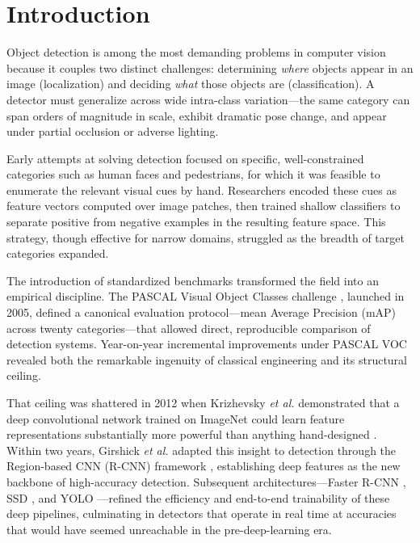 \documentclass[conference]{IEEEtran}
\begin{document}
\section{Introduction}
\label{sec:intro}

Object detection is among the most demanding problems in computer
vision because it couples two distinct challenges: determining
\emph{where} objects appear in an image (localization) and deciding
\emph{what} those objects are (classification).
A detector must generalize across wide intra-class variation---the
same category can span orders of magnitude in scale, exhibit
dramatic pose change, and appear under partial occlusion or
adverse lighting.

Early attempts at solving detection focused on specific,
well-constrained categories such as human faces and pedestrians,
for which it was feasible to enumerate the relevant visual cues by
hand.
Researchers encoded these cues as feature vectors computed over
image patches, then trained shallow classifiers to separate positive
from negative examples in the resulting feature space.
This strategy, though effective for narrow domains, struggled as
the breadth of target categories expanded.

The introduction of standardized benchmarks transformed the field
into an empirical discipline.
The PASCAL Visual Object Classes challenge \cite{everingham2010pascal},
launched in 2005, defined a canonical evaluation protocol---mean
Average Precision (mAP) across twenty categories---that allowed
direct, reproducible comparison of detection systems.
Year-on-year incremental improvements under PASCAL VOC revealed
both the remarkable ingenuity of classical engineering and its
structural ceiling.

That ceiling was shattered in 2012 when Krizhevsky \emph{et al.}
demonstrated that a deep convolutional network trained on ImageNet
could learn feature representations substantially more powerful than
anything hand-designed \cite{krizhevsky2012imagenet}.
Within two years, Girshick \emph{et al.} adapted this insight to
detection through the Region-based CNN (R-CNN) framework
\cite{girshick2014rich}, establishing deep features as the new
backbone of high-accuracy detection.
Subsequent architectures---Faster R-CNN \cite{ren2015faster},
SSD \cite{liu2016ssd}, and YOLO \cite{redmon2016you}---refined
the efficiency and end-to-end trainability of these deep pipelines,
culminating in detectors that operate in real time at accuracies
that would have seemed unreachable in the pre-deep-learning era.
\end{document}
